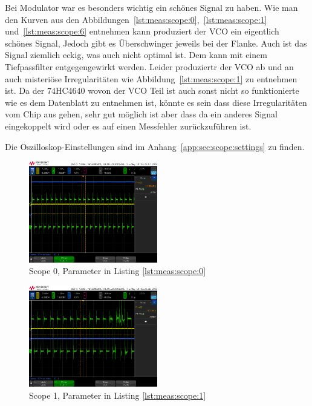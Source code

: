 Bei Modulator war es besonders wichtig ein schönes Signal zu haben.
Wie man den Kurven aus den Abbildungen~\ref{lst:meas:scope:0},~\ref{lst:meas:scope:1} und~\ref{lst:meas:scope:6} entnehmen kann produziert der VCO ein eigentlich schönes Signal, Jedoch gibt es Überschwinger jeweils bei der Flanke. Auch ist das Signal ziemlich eckig, was auch nicht optimal ist. Dem kann mit einem Tiefpassfilter entgegengewirkt werden.
Leider produziertr der VCO ab und an auch misteriöse Irregularitäten wie Abbildung~\ref{lst:meas:scope:1} zu entnehmen ist. Da der 74HC4640 wovon der VCO Teil ist auch sonst nicht so funktionierte wie es dem Datenblatt zu entnehmen ist, könnte es sein dass diese Irregularitäten vom Chip aus gehen, sehr gut möglich ist aber dass da ein anderes Signal eingekoppelt wird oder es auf einen Messfehler zurückzuführen ist.

Die Oszilloskop-Einstellungen sind im Anhang~\ref{app:sec:scope:settings} zu finden.

\begin{figure}[h!tb]
    \centering
    \includegraphics[width=0.5\textwidth]{images/scopeShots/scope_0.png}
    \caption{Scope 0, Parameter in Listing \ref{lst:meas:scope:0}}
    \label{fig:meas:scope:0}
\end{figure}

\begin{figure}[h!tb]
    \centering
    \includegraphics[width=0.5\textwidth]{images/scopeShots/scope_1.png}
    \caption{Scope 1, Parameter in Listing \ref{lst:meas:scope:1}}
    \label{fig:meas:scope:1}
\end{figure}

